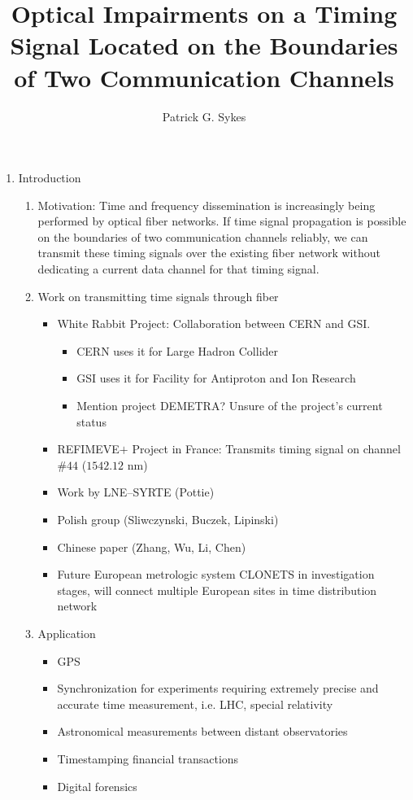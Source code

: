 \documentclass[20pt]{article}
\title{Optical Impairments on a Timing Signal Located on the Boundaries of Two Communication Channels}
\author{Patrick G. Sykes}
\begin{document}
\maketitle

\begin{enumerate}[I]

\item Introduction

\begin{enumerate}[i]

\item Motivation: Time and frequency dissemination is increasingly being performed by optical fiber networks. If time signal propagation is possible on the boundaries of two communication channels reliably, we can transmit these timing signals over the existing fiber network without dedicating a current data channel for that timing signal.
\item Work on transmitting time signals through fiber
\begin{itemize}
	\item White Rabbit Project: Collaboration between CERN and GSI. 
		\begin{itemize} 
			\item CERN uses it for Large Hadron Collider 
			\item GSI uses it for Facility for Antiproton and Ion Research
			\item Mention project DEMETRA? Unsure of the project's current status
		\end{itemize}
		
		\item REFIMEVE$+$ Project in France: Transmits timing signal on channel \#$44$ ($1542.12$ nm)
		
		\item Work by LNE--SYRTE (Pottie)
		
		\item Polish group (Sliwczynski, Buczek, Lipinski)
		
		\item Chinese paper (Zhang, Wu, Li, Chen)
		
		\item Future European metrologic system CLONETS in investigation stages, will connect multiple European sites in time distribution network
\end{itemize}

	\item Application
	\begin{itemize}
		\item GPS
		\item Synchronization for experiments requiring extremely precise and accurate time measurement, i.e. LHC, special relativity
		\item Astronomical measurements between distant observatories
		\item Timestamping financial transactions
		\item Digital forensics
	\end{itemize}


\end{enumerate}
\end{enumerate}
\end{document}
